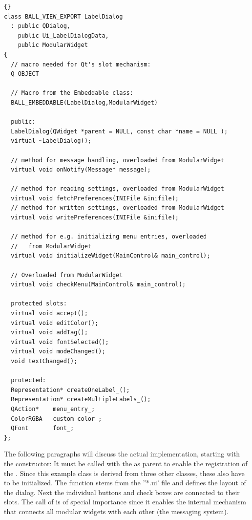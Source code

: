 \begin{lstlisting}{}
class BALL_VIEW_EXPORT LabelDialog 
  : public QDialog,
    public Ui_LabelDialogData,
    public ModularWidget
{
  // macro needed for Qt's slot mechanism:
  Q_OBJECT

  // Macro from the Embeddable class:
  BALL_EMBEDDABLE(LabelDialog,ModularWidget)
	
  public:
  LabelDialog(QWidget *parent = NULL, const char *name = NULL );
  virtual ~LabelDialog();
					
  // method for message handling, overloaded from ModularWidget
  virtual void onNotify(Message* message);
					
  // method for reading settings, overloaded from ModularWidget
  virtual void fetchPreferences(INIFile &inifile);
  // method for written settings, overloaded from ModularWidget
  virtual void writePreferences(INIFile &inifile);
		
  // method for e.g. initializing menu entries, overloaded
  //   from ModularWidget
  virtual void initializeWidget(MainControl& main_control);

  // Overloaded from ModularWidget
  virtual void checkMenu(MainControl& main_control);
	
  protected slots:
  virtual void accept();
  virtual void editColor();
  virtual void addTag();
  virtual void fontSelected();
  virtual void modeChanged();
  void textChanged();

  protected:
  Representation* createOneLabel_();
  Representation* createMultipleLabels_();
  QAction*    menu_entry_;
  ColorRGBA   custom_color_;
  QFont       font_;
};
\end{lstlisting}

The following paragraphs will discuss the actual implementation, starting 
with the constructor: It must be called with the  as 
parent to enable the registration of the . Since this 
example class is derived from three other classes, these also have to be 
initialized. The function  stems from the ''*.ui' file and 
defines the layout of the dialog. Next the individual buttons and check boxes 
are connected to their slots. The call of  is of 
special importance since it enables the internal mechanism that connects all 
modular widgets with each other (\ie the messaging system).

